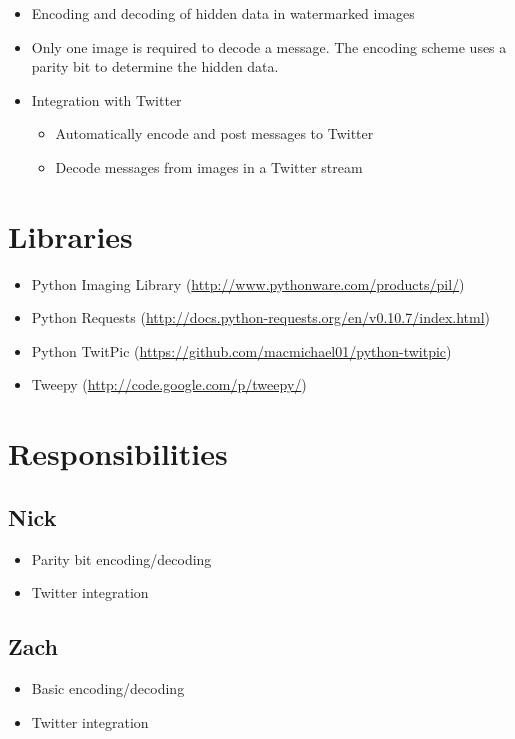 \documentclass[11pt]{article}
\begin{document}
\begin{itemize}
\item Encoding and decoding of hidden data in watermarked images
\item Only one image is required to decode a message. The encoding
    scheme uses a parity bit to determine the hidden data.
\item Integration with Twitter

\begin{itemize}
\item Automatically encode and post messages to Twitter
\item Decode messages from images in a Twitter stream
\end{itemize}

\end{itemize}
\section{Libraries}
\label{sec-5}

\begin{itemize}
\item Python Imaging Library (\href{http://www.pythonware.com/products/pil/}{http://www.pythonware.com/products/pil/})
\item Python Requests
    (\href{http://docs.python-requests.org/en/v0.10.7/index.html}{http://docs.python-requests.org/en/v0.10.7/index.html})
\item Python TwitPic (\href{https://github.com/macmichael01/python-twitpic}{https://github.com/macmichael01/python-twitpic})
\item Tweepy (\href{http://code.google.com/p/tweepy/}{http://code.google.com/p/tweepy/})
\end{itemize}
\section{Responsibilities}
\label{sec-6}

\subsection{Nick}
\label{sec-6.1}

\begin{itemize}
\item Parity bit encoding/decoding
\item Twitter integration
\end{itemize}
\subsection{Zach}
\label{sec-6.2}

\begin{itemize}
\item Basic encoding/decoding
\item Twitter integration
\end{itemize}
\end{document}
